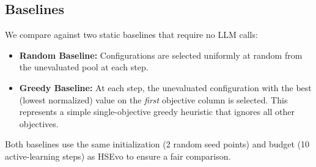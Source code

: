 \documentclass[sigconf,nonacm]{acmart}
\begin{document}
\subsection{Baselines}

We compare against two static baselines that require no LLM calls:
\begin{itemize}
\item \textbf{Random Baseline:} Configurations are selected uniformly at random from the unevaluated pool at each step.
\item \textbf{Greedy Baseline:} At each step, the unevaluated configuration with the best (lowest normalized) value on the \emph{first} objective column is selected. This represents a simple single-objective greedy heuristic that ignores all other objectives.
\end{itemize}
Both baselines use the same initialization (2 random seed points) and budget (10 active-learning steps) as HSEvo to ensure a fair comparison.

\newpage



\end{document}
